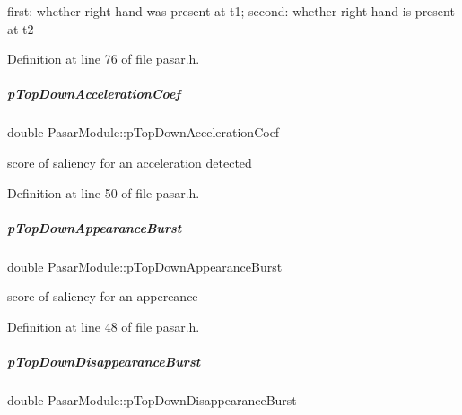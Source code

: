 first\+: whether right hand was present at t1; second\+: whether right hand is present at t2 



Definition at line 76 of file pasar.\+h.

\mbox{\label{group__pasar_a6cd0031d0976255163c72374d085cd68}} 
\subparagraph{\texorpdfstring{p\+Top\+Down\+Acceleration\+Coef}{pTopDownAccelerationCoef}}
{\footnotesize\ttfamily double Pasar\+Module\+::p\+Top\+Down\+Acceleration\+Coef\hspace{0.3cm}{\ttfamily [protected]}}



score of saliency for an acceleration detected 



Definition at line 50 of file pasar.\+h.

\mbox{\label{group__pasar_a036e6eefa05f5d54c446b410a20dad94}} 
\subparagraph{\texorpdfstring{p\+Top\+Down\+Appearance\+Burst}{pTopDownAppearanceBurst}}
{\footnotesize\ttfamily double Pasar\+Module\+::p\+Top\+Down\+Appearance\+Burst\hspace{0.3cm}{\ttfamily [protected]}}



score of saliency for an appereance 



Definition at line 48 of file pasar.\+h.

\mbox{\label{group__pasar_a1ffee40c8bbcbeab1e4a3e06fcb69f74}} 
\subparagraph{\texorpdfstring{p\+Top\+Down\+Disappearance\+Burst}{pTopDownDisappearanceBurst}}
{\footnotesize\ttfamily double Pasar\+Module\+::p\+Top\+Down\+Disappearance\+Burst\hspace{0.3cm}{\ttfamily [protected]}}



